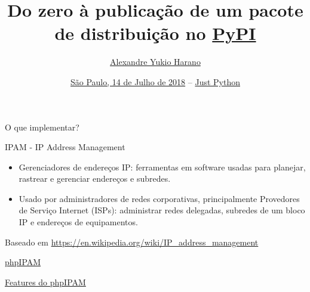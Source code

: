 \documentclass[11pt]{beamer}
\title{\normalsize{Do zero à publicação de um pacote de distribuição no \href{https://pypi.org/}{PyPI}}}
\author{\href{https://alexandre.harano.net.br/}{Alexandre Yukio Harano}}
\institute[.]
{alexandre@harano.net.br\\
 \url{https://alexandre.harano.net.br/}}
\date{\scriptsize{\href{https://justpython.style/}{São Paulo, 14 de Julho de 2018}
 --
\href{https://justpython.style/}{Just Python}}}
\begin{document}
\maketitle

\begin{frame}[standout]
  O que implementar?
\end{frame}

\begin{frame}[fragile]{IPAM - IP Address Management}
  \begin{flushright}
  \begin{itemize}
    \item Gerenciadores de endereços IP: ferramentas em software usadas para planejar, rastrear e gerenciar endereços e subredes.
    \item Usado por administradores de redes corporativas, principalmente Provedores de Serviço Internet (ISPs): administrar redes delegadas, subredes de um bloco IP e endereços de equipamentos.
  \end{itemize}

  \tiny{\vspace*{.25cm}
    Baseado em \url{https://en.wikipedia.org/wiki/IP_address_management}}
  \end{flushright}
\end{frame}

\begin{frame}[fragile]{\href{https://phpipam.net/}{phpIPAM}}
  \hspace*{-.5cm}
\end{frame}

\begin{frame}[fragile]{\href{https://phpipam.net/documents/features/}{Features do phpIPAM}}
  \hspace*{-.5cm}
\end{frame}
\end{document}
